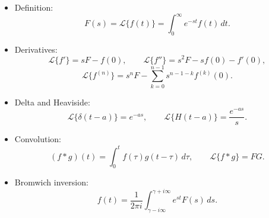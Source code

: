 \begin{itemize}
\item Definition:
\[
F(s)=\mathcal{L}\{f(t)\}=\int_0^\infty e^{-st}f(t)\,dt.
\]
\item Derivatives:
\[
\mathcal{L}\{f'\}=sF-f(0),\qquad
\mathcal{L}\{f''\}=s^2F-sf(0)-f'(0),
\]
\[
\mathcal{L}\{f^{(n)}\}
=
s^nF-\sum_{k=0}^{n-1}s^{n-1-k}f^{(k)}(0).
\]
\item Delta and Heaviside:
\[
\mathcal{L}\{\delta(t-a)\}=e^{-as},\qquad
\mathcal{L}\{H(t-a)\}=\frac{e^{-as}}{s}.
\]
\item Convolution:
\[
(f*g)(t)=\int_0^t f(\tau)g(t-\tau)\,d\tau,
\qquad
\mathcal{L}\{f*g\}=FG.
\]
\item Bromwich inversion:
\[
f(t)=\frac{1}{2\pi i}\int_{\gamma-i\infty}^{\gamma+i\infty}e^{st}F(s)\,ds.
\]
\end{itemize}
